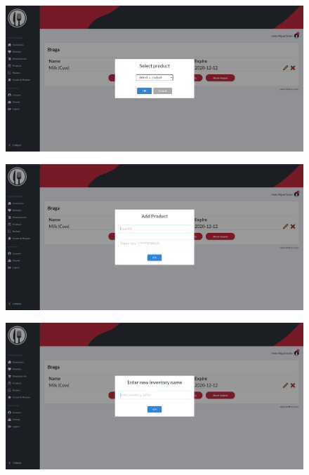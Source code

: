 \documentclass[a4paper]{report}
\begin{document}
    \begin{figure}[H]
        \centering
            \includegraphics[width=\textwidth]{images/produto_final/inserir_produto_produto.png}
    \end{figure}

    \begin{figure}[H]
        \centering
            \includegraphics[width=\textwidth]{images/produto_final/inserir_produto_quantidade.png}
    \end{figure}

    \begin{figure}[H]
        \centering
            \includegraphics[width=\textwidth]{images/produto_final/alterar_nome_iventario.png}
    \end{figure}
\end{document}
